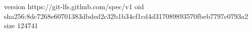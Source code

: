version https://git-lfs.github.com/spec/v1
oid sha256:8dc7268e60701383dbded2c32b1b34cf1cd4d317089893570fbeb7797c0793a2
size 124741
